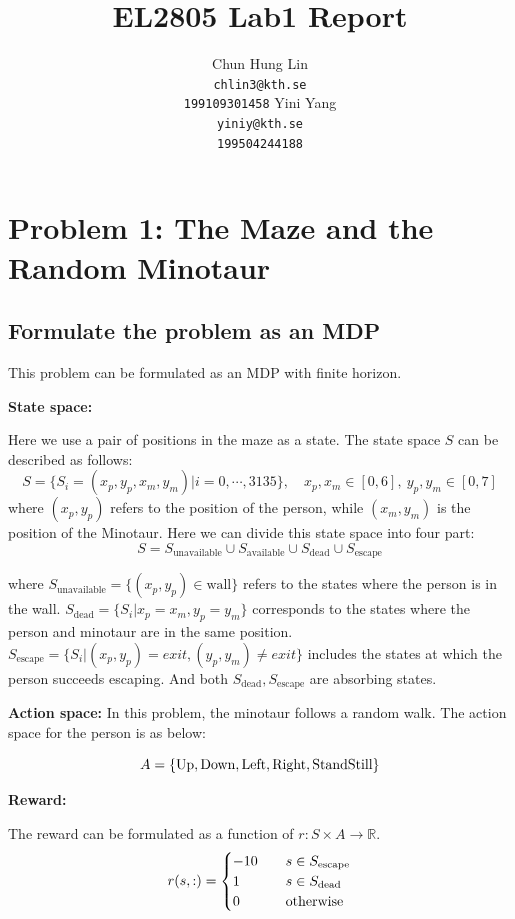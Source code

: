 \documentclass{article}
\title{EL2805 Lab1 Report}
\author{
  Chun Hung Lin \\
  \texttt{chlin3@kth.se} \\
  \texttt{199109301458}
  \And
  Yini Yang \\
  \texttt{yiniy@kth.se} \\
  \texttt{199504244188}
}
\begin{document}
\maketitle

\section{Problem 1: The Maze and the Random Minotaur}

\subsection{Formulate the problem as an MDP}

This problem can be formulated as an MDP with finite horizon.

\textbf{State space:}

Here we use a pair of positions in the maze as a state. The state space $S$ can be described as follows:
$$ S = \{S_i=(x_p,y_p,x_m,y_m)|i=0,\cdots,3135\}, \quad x_p,x_m\in [0,6],\  y_p,y_m\in [0,7]$$
where $(x_p,y_p)$ refers to the position of the person, while $(x_m,y_m)$ is the position of the Minotaur.
Here we can divide this state space into four part:
$$ S = S_{\text{unavailable}}\cup S_{\text{available}}\cup S_{\text{dead}}\cup S_{\text{escape}}$$


where $S_{\text{unavailable}}=\{(x_p,y_p)\in \text{wall}\}$ refers to the states where the person is in the wall.
$S_{\text{dead}}=\{S_i|x_p=x_m,y_p=y_m\}$ corresponds to the states where the person and minotaur are in the same position.
$S_{\text{escape}}=\{S_i|(x_p,y_p)=exit,(y_p,y_m)\neq exit\}$ includes the states at which the person succeeds escaping.
And both $S_{\text{dead}}, S_{\text{escape}}$ are absorbing states.


\textbf{Action space:}
In this problem, the minotaur follows a random walk. The action space for the person is as below:

\begin{equation*}
  A=\{\textup{Up},\textup{Down},\textup{Left},\textup{Right},\textup{StandStill}\}
\end{equation*}

\textbf{Reward:}

The reward can be formulated as a function of $r: S\times A\rightarrow \mathbb{R}$.
\begin{equation*}
  r(s, :) =
  \begin{cases}
    -10  \quad &s\in S_{\text{escape}}\\
    1    \quad &s\in S_{\text{dead}} \\
    0    \quad &\textup{otherwise}
  \end{cases}
\end{equation*}
\end{document}
